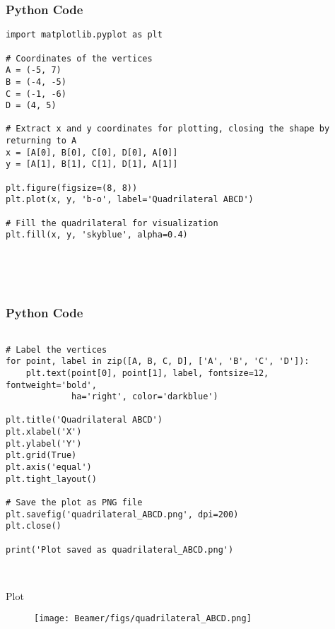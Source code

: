 \documentclass{beamer}
\begin{document}
\begin{frame}[fragile]
    \frametitle{Python Code}
    \begin{lstlisting}
import matplotlib.pyplot as plt

# Coordinates of the vertices
A = (-5, 7)
B = (-4, -5)
C = (-1, -6)
D = (4, 5)

# Extract x and y coordinates for plotting, closing the shape by returning to A
x = [A[0], B[0], C[0], D[0], A[0]]
y = [A[1], B[1], C[1], D[1], A[1]]

plt.figure(figsize=(8, 8))
plt.plot(x, y, 'b-o', label='Quadrilateral ABCD')

# Fill the quadrilateral for visualization
plt.fill(x, y, 'skyblue', alpha=0.4)





    \end{lstlisting}
\end{frame}


\begin{frame}[fragile]
    \frametitle{Python Code}
    \begin{lstlisting}

# Label the vertices
for point, label in zip([A, B, C, D], ['A', 'B', 'C', 'D']):
    plt.text(point[0], point[1], label, fontsize=12, fontweight='bold',
             ha='right', color='darkblue')

plt.title('Quadrilateral ABCD')
plt.xlabel('X')
plt.ylabel('Y')
plt.grid(True)
plt.axis('equal')
plt.tight_layout()

# Save the plot as PNG file
plt.savefig('quadrilateral_ABCD.png', dpi=200)
plt.close()

print('Plot saved as quadrilateral_ABCD.png')



    \end{lstlisting}
\end{frame}




  
\begin{frame}{Plot}

\begin{figure}
    \centering
    \texttt{[image: Beamer/figs/quadrilateral\_ABCD.png]}
    \caption{}
    \label{fig:placeholder}
\end{figure}

\end{frame}
\end{document}
